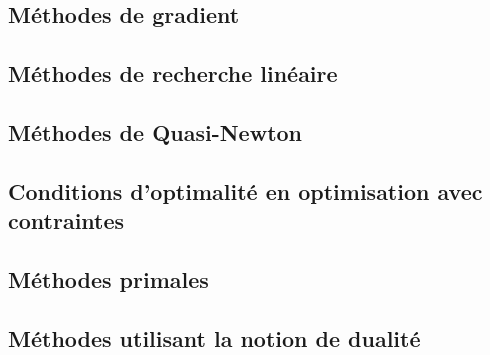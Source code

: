 \subsection{Méthodes de gradient}
\subsection{Méthodes de recherche linéaire}
\subsection{Méthodes de Quasi-Newton}
\subsection{Conditions d'optimalité en optimisation avec contraintes}
\subsection{Méthodes primales}
\subsection{Méthodes utilisant la notion de dualité}